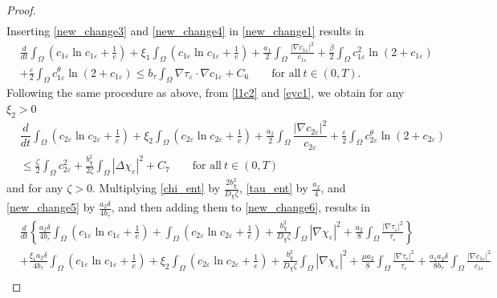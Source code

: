 \documentclass[a4paper,10pt]{article}
\theoremstyle{definition}
\begin{document}
\begin{proof}
\begin{align}
\end{align}
Inserting \eqref{new_change3} and \eqref{new_change4} in \eqref{new_change1} results in
\begin{align}
\label{new_change5}
   & \nonumber \frac{d}{dt} \int_\Omega \left(c_{1\varepsilon} \ln c_{1\varepsilon} + \tfrac{1}{e}\right) + \xi_1  \int_\Omega \left(c_{1\varepsilon} \ln c_{1\varepsilon} + \tfrac{1}{e}\right) + \frac{a_1}{2} \int_\Omega \frac{|\nabla c_{1\varepsilon}|^2}{c_{1\varepsilon}} + \frac{\beta}{2} \int_\Omega c_{1\varepsilon}^2 \ln(2 + c_{1\varepsilon}) \\[5pt]
   & + \frac{\varepsilon}{2} \int_\Omega c_{1\varepsilon}^\theta \ln(2 + c_{1\varepsilon})  \leq b_\tau \int_\Omega  \nabla \tau_\varepsilon \cdot \nabla c_{1\varepsilon}  + C_6 \qquad \text{for all}~ t \in (0, T).
\end{align}
Following the same procedure as above, from \eqref{l1c2} and \eqref{eyc1}, we obtain for any $\xi_2 > 0$ 
\begin{align}
\label{new_change6}
  \nonumber & \dfrac{d}{dt} \int_\Omega \left(c_{2 \varepsilon} \ln c_{2 \varepsilon} + \tfrac{1}{e}\right) + \xi_2 \int_\Omega \left(c_{2 \varepsilon} \ln c_{2 \varepsilon} + \tfrac{1}{e}\right) + \frac{a_2}{2} \int_\Omega \dfrac{|\nabla c_{2 \varepsilon}|^2}{c_{2\varepsilon}}  + \frac{\varepsilon}{2} \int_\Omega c_{2\varepsilon}^\theta \ln(2 + c_{2\varepsilon}) \\[5pt]
  & \leq  \frac{\zeta}{2}\int_\Omega c_{2\varepsilon}^2 + \frac{b_\chi^2}{2\zeta} \int_\Omega |\Delta \chi_\varepsilon|^2 + C_7 \qquad \text{for all}~ t \in (0, T)
\end{align}
and for any $\zeta > 0$. Multiplying \eqref{chi_ent} by $\frac{2 b_\chi^2}{D_\chi \zeta}$, \eqref{tau_ent} by $\frac{a_2}{4}$, and \eqref{new_change5} by $\frac{a_2 \delta}{4 b_\tau}$, and then adding them to \eqref{new_change6}, results in
\begin{align}
    \label{ebnt2}
    \nonumber & \frac{d}{dt}\left\{\frac{a_2 \delta}{4 b_\tau} \int_\Omega \left(c_{1\varepsilon} \ln c_{1\varepsilon} + \tfrac{1}{e}\right) + \int_\Omega \left(c_{2 \varepsilon} \ln c_{2 \varepsilon} + \tfrac{1}{e}\right) + \frac{b_\chi^2}{D_\chi \zeta} \int_\Omega |\nabla \chi_\varepsilon|^2 + \frac{a_2}{8} \int_\Omega \frac{|\nabla \tau_\varepsilon|^2}{\tau_\varepsilon}\right\} \\[5pt]
    \nonumber & + \frac{\xi_1 a_2 \delta}{4 b_\tau} \int_\Omega \left(c_{1\varepsilon} \ln c_{1\varepsilon} + \tfrac{1}{e}\right) + \xi_2 \int_\Omega \left(c_{2 \varepsilon} \ln c_{2 \varepsilon} + \tfrac{1}{e}\right) + \frac{b_\chi^2}{D_\chi \zeta} \int_\Omega |\nabla \chi_\varepsilon|^2 + \frac{\mu a_2}{8} \int_\Omega \frac{|\nabla \tau_\varepsilon|^2}{\tau_\varepsilon}+ \frac{a_1 a_2 \delta}{8 b_\tau} \int_\Omega \frac{|\nabla c_{1\varepsilon}|^2}{c_{1\varepsilon}}\\[5pt]

\end{align}
\end{proof}
\end{document}
